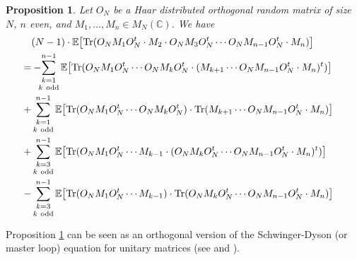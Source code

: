 \documentclass[11pt]{amsart}
\newtheorem{proposition}[theorem]{Proposition}
\theoremstyle{definition}
\numberwithin{theorem}{section}
\newcommand{\Tr}{\mathrm{Tr}}
\begin{document}
\begin{proposition}\label{prop:int_by_parts}
Let $O_N$ be a Haar distributed orthogonal random matrix of
size $N$, $n$ even, and $M_1,\ldots,M_n\in
M_N(\mathbb{C})$. We have
\begin{align*}\lefteqn{
(N-1)\cdot \mathbb{E}\big[\Tr(O_NM_1O_N^t\cdot  M_2 \cdot O_NM_3O_N^t\cdots O_NM_{n-1}O_N^t\cdot M_n)\big]  }\\
=&- \kern-0.5em
\mathop{\sum_{k = 1}^{n-1}}_{k\mathrm{\ odd}}
%
\mathbb{E}\big[\Tr(O_N M_1 O_N^t \cdots O_N M_{k} O_N^t \cdot (M_{k+1}\cdots  O_NM_{n-1}O_N^t\cdot M_n)^t)\big]\\
+&
\mathop{\sum_{k = 1}^{n-1}}_{k\mathrm{\ odd}}
%
\mathbb{E}\big[\Tr(O_N M_1O_N^t\cdots O_NM_{k}O_N^t)\cdot \Tr(M_{k+1}\cdots  O_NM_{n-1}O_N^t\cdot M_n)\big]\\
+&
\mathop{\sum_{k = 3}^{n-1}}_{k\mathrm{\ odd}}
%
\mathbb{E}\big[\Tr(O_N M_1O_N^t\cdots M_{k-1}\cdot (O_NM_{k}O_N^t\cdots O_NM_{n-1}O_N^t\cdot  M_n)^t)\big]\\
-&
\mathop{\sum_{k = 3}^{n-1}}_{k\mathrm{\ odd}}
%
\mathbb{E}\big[\Tr(O_N M_1O_N^t\cdots M_{k-1})\cdot \Tr(O_NM_{k}O_N^t\cdots O_NM_{n-1}O_N^t\cdot  M_n)\big]
\end{align*}
\end{proposition}
Proposition \ref{prop:int_by_parts} can be seen as an
orthogonal version of the Sch\-winger-Dyson (or master loop)
equation for unitary matrices (see \cite[Proof of Theorem
  5.4.10.]{agz} and \cite{gm,gn}).
\end{document}
